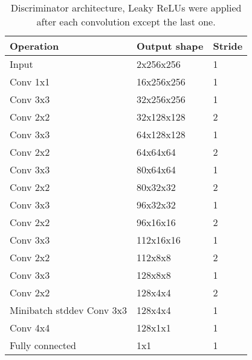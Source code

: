 \begin{table}[t]
    \centering
    \caption{Discriminator architecture, Leaky ReLUs were applied after each convolution except the last one.}
    \label{tab:discriminator}
    \begin{tabular}{|lll|}
        \hline
        Operation          & Output shape     & Stride \\ \hline
        Input              & 2x256x256   & 1   \\
        Conv 1x1           & 16x256x256 & 1    \\ 
        Conv 3x3           & 32x256x256 & 1    \\ 
        Conv 2x2           & 32x128x128 & 2    \\ \hline
        Conv 3x3           & 64x128x128 & 1    \\ 
        Conv 2x2           & 64x64x64 & 2      \\ \hline
        Conv 3x3           & 80x64x64 & 1      \\ 
        Conv 2x2           & 80x32x32 & 2      \\ \hline
        Conv 3x3           & 96x32x32 & 1      \\ 
        Conv 2x2           & 96x16x16 & 2      \\ \hline
        Conv 3x3           & 112x16x16 & 1     \\ 
        Conv 2x2           & 112x8x8 & 2       \\ \hline
        Conv 3x3           & 128x8x8 & 1       \\ 
        Conv 2x2           & 128x4x4 & 2       \\ \hline
        Minibatch stddev
        Conv 3x3           & 128x4x4   & 1     \\
        Conv 4x4           & 128x1x1   & 1     \\ 
        Fully connected    & 1x1 & 1         \\ \hline
    \end{tabular}
\end{table}

